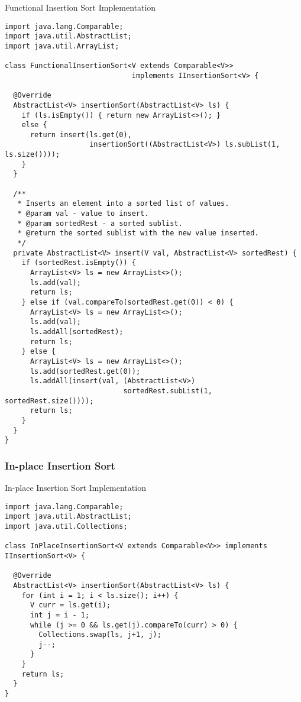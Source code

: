 \begin{cl}[]{Functional Insertion Sort Implementation}
\begin{lstlisting}[language=MyJava]
import java.lang.Comparable;
import java.util.AbstractList;
import java.util.ArrayList;

class FunctionalInsertionSort<V extends Comparable<V>> 
                              implements IInsertionSort<V> {
  
  @Override
  AbstractList<V> insertionSort(AbstractList<V> ls) {
    if (ls.isEmpty()) { return new ArrayList<>(); }
    else { 
      return insert(ls.get(0), 
                    insertionSort((AbstractList<V>) ls.subList(1, ls.size()))); 
    }
  }

  /**
   * Inserts an element into a sorted list of values.
   * @param val - value to insert.
   * @param sortedRest - a sorted sublist.
   * @return the sorted sublist with the new value inserted.
   */
  private AbstractList<V> insert(V val, AbstractList<V> sortedRest) {
    if (sortedRest.isEmpty()) {
      ArrayList<V> ls = new ArrayList<>();
      ls.add(val);
      return ls;
    } else if (val.compareTo(sortedRest.get(0)) < 0) {
      ArrayList<V> ls = new ArrayList<>();
      ls.add(val);
      ls.addAll(sortedRest);
      return ls;
    } else {
      ArrayList<V> ls = new ArrayList<>();
      ls.add(sortedRest.get(0));
      ls.addAll(insert(val, (AbstractList<V>) 
                            sortedRest.subList(1, sortedRest.size())));
      return ls;
    }
  }
}
\end{lstlisting}
\end{cl}

\subsubsection*{In-place Insertion Sort}
\begin{cl}[]{In-place Insertion Sort Implementation}
\begin{lstlisting}[language=MyJava]
import java.lang.Comparable;
import java.util.AbstractList;
import java.util.Collections;

class InPlaceInsertionSort<V extends Comparable<V>> implements IInsertionSort<V> {

  @Override
  AbstractList<V> insertionSort(AbstractList<V> ls) {
    for (int i = 1; i < ls.size(); i++) {
      V curr = ls.get(i);
      int j = i - 1;
      while (j >= 0 && ls.get(j).compareTo(curr) > 0) {
        Collections.swap(ls, j+1, j);
        j--;
      }
    }
    return ls;
  }
}
\end{lstlisting}
\end{cl}

